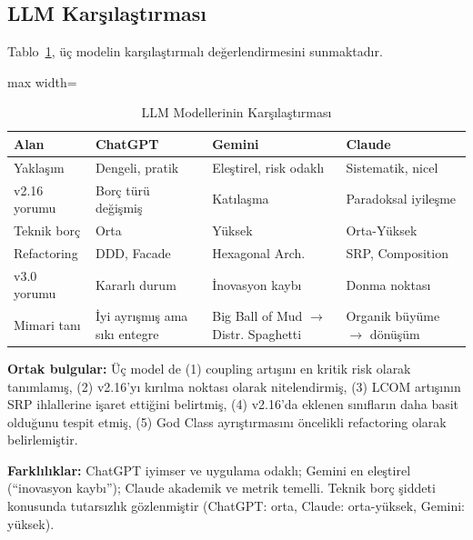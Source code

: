 \documentclass[conference]{IEEEtran}
\begin{document}
\subsection{LLM Kar\c{s}{\i}la\c{s}t{\i}rmas{\i}}
Tablo~\ref{tab:llm}, \"u\c{c} modelin kar\c{s}{\i}la\c{s}t{\i}rmal{\i} de\u{g}erlendirmesini sunmaktad{\i}r.

\begin{table}[htbp]
\caption{LLM Modellerinin Kar\c{s}{\i}la\c{s}t{\i}rmas{\i}}
\label{tab:llm}
\centering
\begin{adjustbox}{max width=\columnwidth}
\begin{tabular}{p{2.2cm}p{1.8cm}p{1.8cm}p{1.8cm}}
\toprule
Alan & ChatGPT & Gemini & Claude \\
\midrule
Yakla\c{s}{\i}m & Dengeli, pratik & Ele\c{s}tirel, risk odakl{\i} & Sistematik, nicel \\
v2.16 yorumu & Bor\c{c} t\"ur\"u de\u{g}i\c{s}mi\c{s} & Kat{\i}la\c{s}ma & Paradoksal iyile\c{s}me \\
Teknik bor\c{c} & Orta & Y\"uksek & Orta-Y\"uksek \\
Refactoring & DDD, Facade & Hexagonal Arch. & SRP, Composition \\
v3.0 yorumu & Kararl{\i} durum & \.{I}novasyon kayb{\i} & Donma noktas{\i} \\
Mimari tan{\i} & \.{I}yi ayr{\i}\c{s}m{\i}\c{s} ama s{\i}k{\i} entegre & Big Ball of Mud $\rightarrow$ Distr. Spaghetti & Organik b\"uy\"ume $\rightarrow$ d\"on\"u\c{s}\"um \\
\bottomrule
\end{tabular}
\end{adjustbox}
\end{table}

\textbf{Ortak bulgular:} \"U\c{c} model de (1) coupling art{\i}\c{s}{\i}n{\i} en kritik risk olarak tan{\i}mlam{\i}\c{s}, (2) v2.16'y{\i} k{\i}r{\i}lma noktas{\i} olarak nitelendirmi\c{s}, (3) LCOM art{\i}\c{s}{\i}n{\i}n SRP ihlallerine i\c{s}aret etti\u{g}ini belirtmi\c{s}, (4) v2.16'da eklenen s{\i}n{\i}flar{\i}n daha basit oldu\u{g}unu tespit etmi\c{s}, (5) God Class ayr{\i}\c{s}t{\i}rmas{\i}n{\i} \"oncelikli refactoring olarak belirlemi\c{s}tir.

\textbf{Farkl{\i}l{\i}klar:} ChatGPT iyimser ve uygulama odakl{\i}; Gemini en ele\c{s}tirel (``inovasyon kayb{\i}''); Claude akademik ve metrik temelli. Teknik bor\c{c} \c{s}iddeti konusunda tutars{\i}zl{\i}k g\"ozlenmi\c{s}tir (ChatGPT: orta, Claude: orta-y\"uksek, Gemini: y\"uksek).
\end{document}
